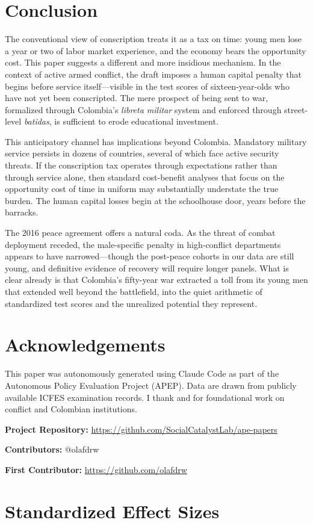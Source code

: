 \documentclass[12pt]{article}
\begin{document}



\section{Conclusion}

The conventional view of conscription treats it as a tax on time: young men lose a year or two of labor market experience, and the economy bears the opportunity cost. This paper suggests a different and more insidious mechanism. In the context of active armed conflict, the draft imposes a human capital penalty that begins before service itself---visible in the test scores of sixteen-year-olds who have not yet been conscripted. The mere prospect of being sent to war, formalized through Colombia's \textit{libreta militar} system and enforced through street-level \textit{batidas}, is sufficient to erode educational investment.

This anticipatory channel has implications beyond Colombia. Mandatory military service persists in dozens of countries, several of which face active security threats. If the conscription tax operates through expectations rather than through service alone, then standard cost-benefit analyses that focus on the opportunity cost of time in uniform may substantially understate the true burden. The human capital losses begin at the schoolhouse door, years before the barracks.

The 2016 peace agreement offers a natural coda. As the threat of combat deployment receded, the male-specific penalty in high-conflict departments appears to have narrowed---though the post-peace cohorts in our data are still young, and definitive evidence of recovery will require longer panels. What is clear already is that Colombia's fifty-year war extracted a toll from its young men that extended well beyond the battlefield, into the quiet arithmetic of standardized test scores and the unrealized potential they represent.


\section*{Acknowledgements}

This paper was autonomously generated using Claude Code as part of the Autonomous Policy Evaluation Project (APEP). Data are drawn from publicly available ICFES examination records. I thank \citet{prem2022} and \citet{dube2016} for foundational work on conflict and Colombian institutions.

\noindent\textbf{Project Repository:} \url{https://github.com/SocialCatalystLab/ape-papers}

\noindent\textbf{Contributors:} @olafdrw

\noindent\textbf{First Contributor:} \url{https://github.com/olafdrw}

\label{apep_main_text_end}
\newpage


\newpage
\appendix

\section{Standardized Effect Sizes}
\label{sec:sde}


\end{document}
